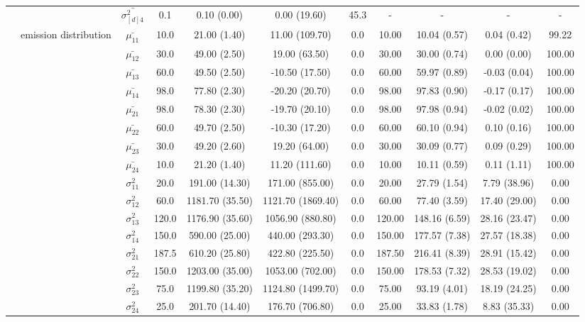 \begin{table}[h]
{\begin{tabular}{ccccccccccc}
 &  & $\bar{\sigma^2_{[d]4}}$ & 0.1 & 0.10 (0.00) & 0.00 (19.60) & 45.3 & - & - & - & - \\
 & emission distribution & $\bar{\mu_{11}}$ & 10.0 & 21.00 (1.40) & 11.00 (109.70) & 0.0 & 10.00 & 10.04 (0.57) & 0.04 (0.42) & 99.22 \\
 & \multirow{15}{*}{} & $\bar{\mu_{12}}$ & 30.0 & 49.00 (2.50) & 19.00 (63.50) & 0.0 & 30.00 & 30.00 (0.74) & 0.00 (0.00) & 100.00 \\
 &  & $\bar{\mu_{13}}$ & 60.0 & 49.50 (2.50) & -10.50 (17.50) & 0.0 & 60.00 & 59.97 (0.89) & -0.03 (0.04) & 100.00 \\
 &  & $\bar{\mu_{14}}$ & 98.0 & 77.80 (2.30) & -20.20 (20.70) & 0.0 & 98.00 & 97.83 (0.90) & -0.17 (0.17) & 100.00 \\
 &  & $\bar{\mu_{21}}$ & 98.0 & 78.30 (2.30) & -19.70 (20.10) & 0.0 & 98.00 & 97.98 (0.94) & -0.02 (0.02) & 100.00 \\
 &  & $\bar{\mu_{22}}$ & 60.0 & 49.70 (2.50) & -10.30 (17.20) & 0.0 & 60.00 & 60.10 (0.94) & 0.10 (0.16) & 100.00 \\
 &  & $\bar{\mu_{23}}$ & 30.0 & 49.20 (2.60) & 19.20 (64.00) & 0.0 & 30.00 & 30.09 (0.77) & 0.09 (0.29) & 100.00 \\
 &  & $\bar{\mu_{24}}$ & 10.0 & 21.20 (1.40) & 11.20 (111.60) & 0.0 & 10.00 & 10.11 (0.59) & 0.11 (1.11) & 100.00 \\
 &  & $\sigma^2_{11}$ & 20.0 & 191.00 (14.30) & 171.00 (855.00) & 0.0 & 20.00 & 27.79 (1.54) & 7.79 (38.96) & 0.00 \\
 &  & $\sigma^2_{12}$ & 60.0 & 1181.70 (35.50) & 1121.70 (1869.40) & 0.0 & 60.00 & 77.40 (3.59) & 17.40 (29.00) & 0.00 \\
 &  & $\sigma^2_{13}$ & 120.0 & 1176.90 (35.60) & 1056.90 (880.80) & 0.0 & 120.00 & 148.16 (6.59) & 28.16 (23.47) & 0.00 \\
 &  & $\sigma^2_{14}$ & 150.0 & 590.00 (25.00) & 440.00 (293.30) & 0.0 & 150.00 & 177.57 (7.38) & 27.57 (18.38) & 0.00 \\
 &  & $\sigma^2_{21}$ & 187.5 & 610.20 (25.80) & 422.80 (225.50) & 0.0 & 187.50 & 216.41 (8.39) & 28.91 (15.42) & 0.00 \\
 &  & $\sigma^2_{22}$ & 150.0 & 1203.00 (35.00) & 1053.00 (702.00) & 0.0 & 150.00 & 178.53 (7.32) & 28.53 (19.02) & 0.00 \\
 &  & $\sigma^2_{23}$ & 75.0 & 1199.80 (35.20) & 1124.80 (1499.70) & 0.0 & 75.00 & 93.19 (4.01) & 18.19 (24.25) & 0.00 \\
 &  & $\sigma^2_{24}$ & 25.0 & 201.70 (14.40) & 176.70 (706.80) & 0.0 & 25.00 & 33.83 (1.78) & 8.83 (35.33) & 0.00 \\

\end{tabular}}
\end{table}
